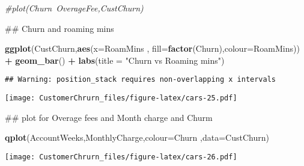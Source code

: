 \documentclass[]{article}
\newenvironment{Shaded}{\begin{snugshade}}{\end{snugshade}}
\newcommand{\KeywordTok}[1]{\textcolor[rgb]{0.13,0.29,0.53}{\textbf{#1}}}
\newcommand{\DataTypeTok}[1]{\textcolor[rgb]{0.13,0.29,0.53}{#1}}
\newcommand{\DecValTok}[1]{\textcolor[rgb]{0.00,0.00,0.81}{#1}}
\newcommand{\StringTok}[1]{\textcolor[rgb]{0.31,0.60,0.02}{#1}}
\newcommand{\CommentTok}[1]{\textcolor[rgb]{0.56,0.35,0.01}{\textit{#1}}}
\newcommand{\OtherTok}[1]{\textcolor[rgb]{0.56,0.35,0.01}{#1}}
\newcommand{\OperatorTok}[1]{\textcolor[rgb]{0.81,0.36,0.00}{\textbf{#1}}}
\newcommand{\NormalTok}[1]{#1}
\begin{document}
\begin{Shaded}
\begin{Highlighting}[]
\CommentTok{#plot(Churn~OverageFee,CustChurn)}


\NormalTok{## Churn and roaming mins}

\KeywordTok{ggplot}\NormalTok{(CustChurn,}\KeywordTok{aes}\NormalTok{(}\DataTypeTok{x=}\NormalTok{RoamMins  , }\DataTypeTok{fill=}\KeywordTok{factor}\NormalTok{(Churn),}\DataTypeTok{colour=}\NormalTok{RoamMins))  }\OperatorTok{+}\StringTok{ }\KeywordTok{geom_bar}\NormalTok{() }\OperatorTok{+}\StringTok{  }\KeywordTok{labs}\NormalTok{(}\DataTypeTok{title =} \StringTok{"Churn vs Roaming mins"}\NormalTok{)}
\end{Highlighting}
\end{Shaded}

\begin{verbatim}
## Warning: position_stack requires non-overlapping x intervals
\end{verbatim}

\texttt{[image: CustomerChrurn\_files/figure-latex/cars-25.pdf]}

\begin{Shaded}
\begin{Highlighting}[]
\NormalTok{## plot for Overage fees and Month charge and Churm}

\KeywordTok{qplot}\NormalTok{(AccountWeeks,MonthlyCharge,}\DataTypeTok{colour=}\NormalTok{Churn ,}\DataTypeTok{data=}\NormalTok{CustChurn)}
\end{Highlighting}
\end{Shaded}

\texttt{[image: CustomerChrurn\_files/figure-latex/cars-26.pdf]}

\begin{Shaded}
\end{Shaded}
\end{document}
